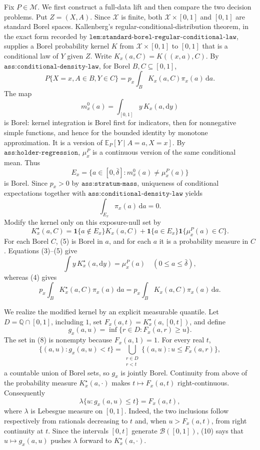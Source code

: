 Fix \(P\in\mathcal M\).  We first construct a full-data lift and then compare the two decision problems.  Put \(Z=(X,A)\).  Since \(\mathcal X\) is finite, both \(\mathcal X\times[0,1]\) and \([0,1]\) are standard Borel spaces.  Kallenberg's regular-conditional-distribution theorem, in the exact form recorded by \(\texttt{lem:standard-borel-regular-conditional-law}\), supplies a Borel probability kernel \(K\) from \(\mathcal X\times[0,1]\) to \([0,1]\) that is a conditional law of \(Y\) given \(Z\).  Write \(K_x(a,C)=K((x,a),C)\).  By \(\texttt{ass:conditional-density-law}\), for Borel \(B,C\subseteq[0,1]\),
\[
 P\{X=x,A\in B,Y\in C\}
 =p_x\int_B K_x(a,C)\pi_x(a)\,\mathrm da. \tag{1}
\]
The map
\[
 m_x^0(a)=\int_{[0,1]}y\,K_x(a,\mathrm dy) \tag{2}
\]
is Borel: kernel integration is Borel first for indicators, then for nonnegative simple functions, and hence for the bounded identity by monotone approximation.  It is a version of \(\mathbb E_P[Y\mid A=a,X=x]\).  By \(\texttt{ass:holder-regression}\), \(\mu_x^P\) is a continuous version of the same conditional mean.  Thus
\[
 E_x=\{a\in[0,\bar\delta]:m_x^0(a)\ne\mu_x^P(a)\} \tag{3}
\]
is Borel.  Since \(p_x>0\) by \(\texttt{ass:stratum-mass}\), uniqueness of conditional expectations together with \(\texttt{ass:conditional-density-law}\) yields
\[
 \int_{E_x}\pi_x(a)\,\mathrm da=0. \tag{4}
\]
Modify the kernel only on this exposure-null set by
\[
 K_x^\star(a,C)=
 \mathbf 1\{a\notin E_x\}K_x(a,C)
 +\mathbf 1\{a\in E_x\}\mathbf 1\{\mu_x^P(a)\in C\}. \tag{5}
\]
For each Borel \(C\), (5) is Borel in \(a\), and for each \(a\) it is a probability measure in \(C\).  Equations (3)--(5) give
\[
 \int y\,K_x^\star(a,\mathrm dy)=\mu_x^P(a)
 \quad(0\leq a\leq\bar\delta), \tag{6}
\]
whereas (4) gives
\[
 p_x\int_BK_x^\star(a,C)\pi_x(a)\,\mathrm da
 =p_x\int_BK_x(a,C)\pi_x(a)\,\mathrm da. \tag{7}
\]

We realize the modified kernel by an explicit measurable quantile.  Let \(D=\mathbb Q\cap[0,1]\), including \(1\), set \(F_x(a,t)=K_x^\star(a,[0,t])\), and define
\[
 g_x(a,u)=\inf\{r\in D:F_x(a,r)\geq u\}. \tag{8}
\]
The set in (8) is nonempty because \(F_x(a,1)=1\).  For every real \(t\),
\[
 \{(a,u):g_x(a,u)<t\}
 =\bigcup_{\substack{r\in D\\r<t}}
 \{(a,u):u\leq F_x(a,r)\}, \tag{9}
\]
a countable union of Borel sets, so \(g_x\) is jointly Borel.  Continuity from above of the probability measure \(K_x^\star(a,\cdot)\) makes \(t\mapsto F_x(a,t)\) right-continuous.  Consequently
\[
 \lambda\{u:g_x(a,u)\leq t\}=F_x(a,t), \tag{10}
\]
where \(\lambda\) is Lebesgue measure on \([0,1]\).  Indeed, the two inclusions follow respectively from rationals decreasing to \(t\) and, when \(u>F_x(a,t)\), from right continuity at \(t\).  Since the intervals \([0,t]\) generate \(\mathcal B([0,1])\), (10) says that \(u\mapsto g_x(a,u)\) pushes \(\lambda\) forward to \(K_x^\star(a,\cdot)\).

